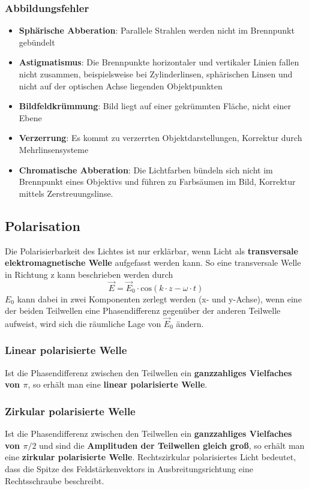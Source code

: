 \documentclass[12pt,a4paper,ngerman]{article}
\begin{document}
\subsubsection*{Abbildungsfehler}
\begin{itemize}
\item \textbf{Sphärische Abberation}: Parallele Strahlen werden nicht im Brennpunkt gebündelt
\item \textbf{Astigmatismus}: Die Brennpunkte horizontaler und vertikaler Linien fallen nicht zusammen, beispielsweise bei Zylinderlinsen, sphärischen Linsen und nicht auf der optischen Achse liegenden Objektpunkten
\item \textbf{Bildfeldkrümmung}: Bild liegt auf einer gekrümmten Fläche, nicht einer Ebene
\item \textbf{Verzerrung}: Es kommt zu verzerrten Objektdarstellungen, Korrektur durch Mehrlinsensysteme
\item \textbf{Chromatische Abberation}: Die Lichtfarben bündeln sich nicht im Brennpunkt eines Objektivs und führen zu Farbsäumen im Bild, Korrektur mittels Zerstreuungslinse. 
\end{itemize}

\subsection{Polarisation}

Die Polarisierbarkeit des Lichtes ist nur erklärbar, wenn Licht als \textbf{transversale elektromagnetische Welle} aufgefasst werden kann.  So eine transversale Welle in Richtung z kann beschrieben werden durch
\begin{equation}
\vec{E} = \vec{E}_0 \cdot \text{cos}(k\cdot z - \omega \cdot t)
\end{equation}
$E_0$ kann dabei in zwei Komponenten zerlegt werden (x- und y-Achse), wenn eine der beiden Teilwellen eine Phasendifferenz gegenüber der anderen Teilwelle aufweist, wird sich die räumliche Lage von $\vec{E}_0$ ändern. 
\subsubsection*{Linear polarisierte Welle}
Ist die Phasendifferenz zwischen den Teilwellen ein \textbf{ganzzahliges Vielfaches von $\pi$}, so erhält man eine \textbf{linear polarisierte Welle}. 

\subsubsection*{Zirkular polarisierte Welle}
Ist die Phasendifferenz zwischen den Teilwellen ein \textbf{ganzzahliges Vielfaches von $\pi /2$} und sind die \textbf{Amplituden der Teilwellen gleich groß}, so erhält man eine \textbf{zirkular polarisierte Welle}. Rechtszirkular polarisiertes Licht bedeutet, dass die Spitze des Feldstärkenvektors in Ausbreitungsrichtung eine Rechtsschraube beschreibt. 
\end{document}
